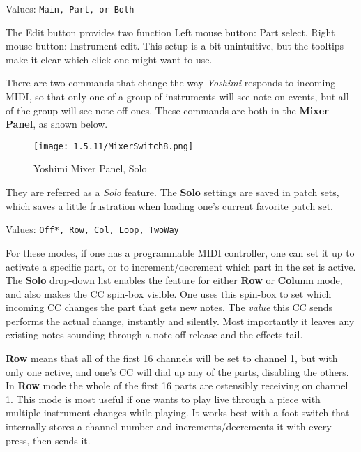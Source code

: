    Values: \texttt{Main, Part, or Both}

   The Edit button provides two function
   Left mouse button: Part select.
   Right mouse button: Instrument edit.
   This setup is a bit unintuitive, but the tooltips make it clear
   which click one might want to use.

   There are two commands that change the way
   \textsl{Yoshimi} responds to incoming MIDI,
   so that only one of a group of instruments will see note-on events, but all
   of the group will see note-off ones. These commands
   are both in the \textbf{Mixer Panel}, as shown below.
\begin{figure}[H]
   \centering
   \texttt{[image: 1.5.11/MixerSwitch8.png]}
   \caption[Yoshimi Mixer Panel]{Yoshimi Mixer Panel, Solo}
   \label{fig:yoshimi_part_panel_solo}
\end{figure}
   They are referred as a \textsl{Solo} feature.
   The \textbf{Solo} settings are saved in patch sets, which saves a
   little frustration when loading one's current favorite patch set.

   Values: \texttt{Off*, Row, Col, Loop, TwoWay}

   For these modes, if one has a programmable MIDI controller, one can set it
   up to activate a specific part, or to increment/decrement which part in the
   set is active.  The \textbf{Solo} drop-down list enables the feature for
   either \textbf{Row} or \textbf{Col}umn mode, and also makes the CC spin-box
   visible.
   One uses this spin-box to set which incoming CC changes the part that gets
   new notes.
   The \textsl{value} this CC sends performs the actual change, instantly and
   silently. Most importantly it leaves any existing notes sounding through a
   note off release and the effects tail.

   \textbf{Row} means that all of the first 16 channels will be set to channel
   1, but with only one active, and one's CC will dial up any of the parts,
   disabling the others.
   In \textbf{Row} mode the whole of the first 16 parts are ostensibly
   receiving on channel 1.  This mode is most useful if one wants to play live
   through a piece with multiple instrument changes while playing. It works
   best with a foot switch that internally stores a channel number and
   increments/decrements it with every press, then sends it.

